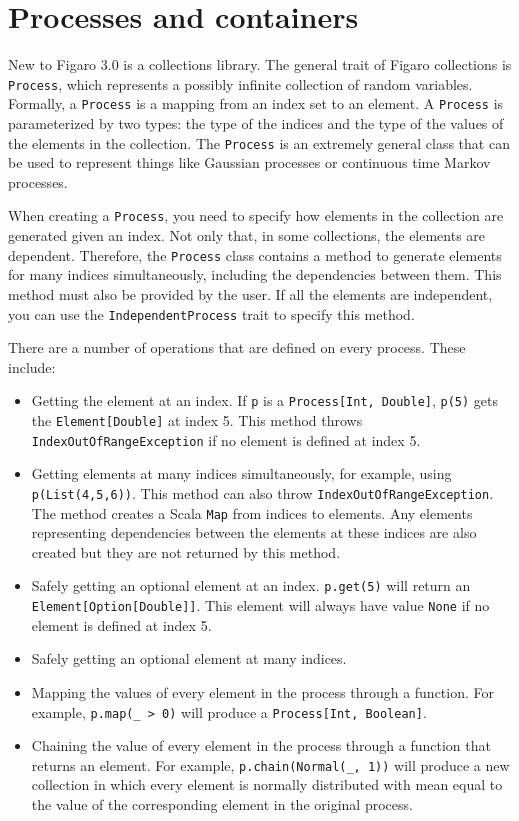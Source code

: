 \section{Processes and containers}

New to Figaro 3.0 is a collections library. The general trait of Figaro collections is \texttt{Process}, which represents a possibly infinite collection of random variables. Formally, a \texttt{Process} is a mapping from an index set to an element. A \texttt{Process} is parameterized by two types: the type of the indices and the type of the values of the elements in the collection. The \texttt{Process} is an extremely general class that can be used to represent things like Gaussian processes or continuous time Markov processes.

When creating a \texttt{Process}, you need to specify how elements in the collection are generated given an index. Not only that, in some collections, the elements are dependent. Therefore, the \texttt{Process} class contains a method to generate elements for many indices simultaneously, including the dependencies between them. This method must also be provided by the user. If all the elements are independent, you can use the \texttt{IndependentProcess} trait to specify this method.

There are a number of operations that are defined on every process. These include:
\begin{itemize}
\item Getting the element at an index. If \texttt{p} is a \texttt{Process[Int, Double]}, \texttt{p(5)} gets the \texttt{Element[Double]} at index 5. This method throws \texttt{IndexOutOfRangeException} if no element is defined at index 5.
\item Getting elements at many indices simultaneously, for example, using \texttt{p(List(4,5,6))}. This method can also throw \texttt{IndexOutOf\-RangeException}. The method creates a Scala \texttt{Map} from indices to elements. Any elements representing dependencies between the elements at these indices are also created but they are not returned by this method.
\item Safely getting an optional element at an index. \texttt{p.get(5)} will return an \texttt{Element[Option[Double]]}. This element will always have value \texttt{None} if no element is defined at index 5.
\item Safely getting an optional element at many indices.
\item Mapping the values of every element in the process through a function. For example, \texttt{p.map(\_ > 0)} will produce a \texttt{Process[Int, Boolean]}.
\item Chaining the value of every element in the process through a function that returns an element. For example, \texttt{p.chain(Normal(\_, 1))} will produce a new collection in which every element is normally distributed with mean equal to the value of the corresponding element in the original process.
\end{itemize}

